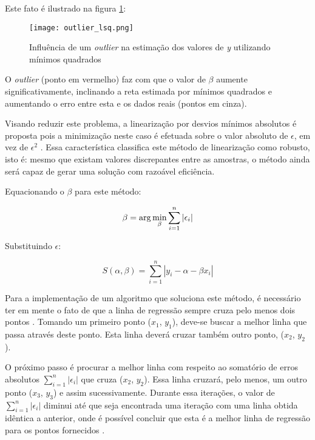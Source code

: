 Este fato é ilustrado na figura \ref{fig:infl_outlier}:

\begin{figure}[htp]
    \centering
    \texttt{[image: outlier\_lsq.png]}
    \caption{Influência de um \textit{outlier} na estimação dos valores de \textit{y} utilizando mínimos quadrados}
    \label{fig:infl_outlier}
\end{figure}

O \textit{outlier} (ponto em vermelho) faz com que o valor de $\beta$ aumente significativamente, inclinando a reta estimada por mínimos quadrados e aumentando o erro entre esta e os dados reais (pontos em cinza).

Visando reduzir este problema, a linearização por desvios mínimos absolutos é proposta pois a minimização neste caso é efetuada sobre o valor absoluto de $\epsilon$, em vez de $\epsilon^2$ \cite{lad}. Essa característica classifica este método de linearização como robusto\cite{robust}, isto é: mesmo que existam valores discrepantes entre as amostras, o método ainda será capaz de gerar uma solução com razoável eficiência.

Equacionando o $\beta$ para este método:

\begin{equation}\label{eq:17}
 \beta =\arg\min_{\beta}\sum_{i=1}^{n}|\epsilon_{i}|\\ 
\end{equation}

Substituindo $\epsilon$:

\begin{equation}\label{eq:18}
S(\alpha, \beta) = \sum_{i=1}^{n} |y_i - \alpha - \beta x_i|
\end{equation}

Para a implementação de um algoritmo que soluciona este método, é necessário ter em mente o fato de que a linha de regressão sempre cruza pelo menos dois pontos \cite{lad}. Tomando um primeiro ponto ($x_1$, $y_1$), deve-se buscar a melhor linha que passa através deste ponto. Esta linha deverá cruzar também outro ponto, ($x_2$, $y_2$). 

O próximo passo é procurar a melhor linha com respeito ao somatório de erros absolutos $\sum_{i=1}^{n}|\epsilon_{i}|$ que cruza ($x_2$, $y_2$). Essa linha cruzará, pelo menos, um outro ponto ($x_3$, $y_3$) e assim sucessivamente. Durante essa iterações, o valor de $\sum_{i=1}^{n}|\epsilon_{i}|$ diminui até que seja encontrada uma iteração com uma linha obtida idêntica a anterior, onde é possível concluir que esta é a melhor linha de regressão para os pontos fornecidos \cite{conciseenclyclopediaofstatistics}.

